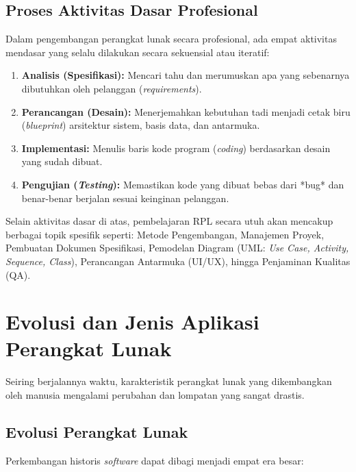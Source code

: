 \documentclass[12pt,a4paper]{article}
\begin{document}
\subsection{Proses Aktivitas Dasar Profesional}
Dalam pengembangan perangkat lunak secara profesional, ada empat aktivitas mendasar yang selalu dilakukan secara sekuensial atau iteratif:
\begin{enumerate}
    \item \textbf{Analisis (Spesifikasi):} Mencari tahu dan merumuskan apa yang sebenarnya dibutuhkan oleh pelanggan (\textit{requirements}).
    \item \textbf{Perancangan (Desain):} Menerjemahkan kebutuhan tadi menjadi cetak biru (\textit{blueprint}) arsitektur sistem, basis data, dan antarmuka.
    \item \textbf{Implementasi:} Menulis baris kode program (\textit{coding}) berdasarkan desain yang sudah dibuat.
    \item \textbf{Pengujian (\textit{Testing}):} Memastikan kode yang dibuat bebas dari *bug* dan benar-benar berjalan sesuai keinginan pelanggan.
\end{enumerate}

Selain aktivitas dasar di atas, pembelajaran RPL secara utuh akan mencakup berbagai topik spesifik seperti: Metode Pengembangan, Manajemen Proyek, Pembuatan Dokumen Spesifikasi, Pemodelan Diagram (UML: \textit{Use Case, Activity, Sequence, Class}), Perancangan Antarmuka (UI/UX), hingga Penjaminan Kualitas (QA).

\newpage
\section{Evolusi dan Jenis Aplikasi Perangkat Lunak}

Seiring berjalannya waktu, karakteristik perangkat lunak yang dikembangkan oleh manusia mengalami perubahan dan lompatan yang sangat drastis.

\subsection{Evolusi Perangkat Lunak}
Perkembangan historis \textit{software} dapat dibagi menjadi empat era besar:
\end{document}
